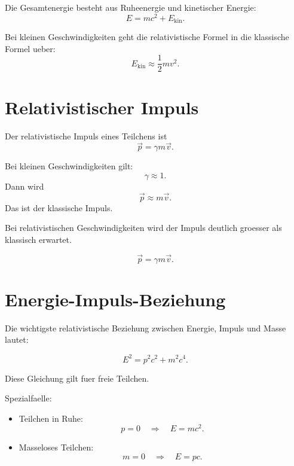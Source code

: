 \begin{conceptbox}
Die Gesamtenergie besteht aus Ruheenergie und kinetischer Energie:
\[
    E = mc^2 + E_{\mathrm{kin}}.
\]

Bei kleinen Geschwindigkeiten geht die relativistische Formel in die klassische
Formel ueber:
\[
    E_{\mathrm{kin}}\approx \frac{1}{2}mv^2.
\]
\end{conceptbox}

\section{Relativistischer Impuls}

\begin{definitionbox}
Der relativistische Impuls eines Teilchens ist
\[
    \vec p = \gamma m \vec v.
\]
\end{definitionbox}

\begin{conceptbox}
Bei kleinen Geschwindigkeiten gilt:
\[
    \gamma\approx 1.
\]
Dann wird
\[
    \vec p\approx m\vec v.
\]
Das ist der klassische Impuls.

Bei relativistischen Geschwindigkeiten wird der Impuls deutlich groesser als
klassisch erwartet.
\end{conceptbox}

\begin{formulabox}
\[
    \vec p = \gamma m\vec v.
\]
\end{formulabox}

\section{Energie-Impuls-Beziehung}

Die wichtigste relativistische Beziehung zwischen Energie, Impuls und Masse lautet:

\begin{formulabox}
\[
    E^2
    =
    p^2c^2 + m^2c^4.
\]
\end{formulabox}

\begin{conceptbox}
Diese Gleichung gilt fuer freie Teilchen.

Spezialfaelle:
\begin{itemize}
    \item Teilchen in Ruhe:
    \[
        p=0
        \quad\Rightarrow\quad
        E=mc^2.
    \]
    \item Masseloses Teilchen:
    \[
        m=0
        \quad\Rightarrow\quad
        E=pc.
    \]
\end{itemize}
\end{conceptbox}

